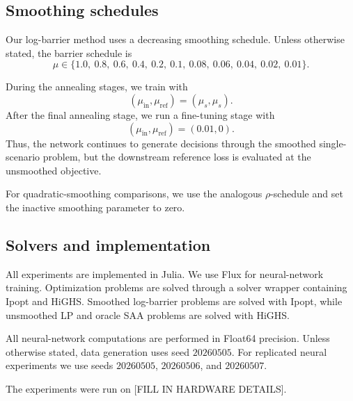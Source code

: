 \subsection{Smoothing schedules}

Our log-barrier method uses a decreasing smoothing schedule. Unless otherwise stated, the barrier schedule is
\[
\mu \in
\{1.0,\ 0.8,\ 0.6,\ 0.4,\ 0.2,\ 0.1,\ 0.08,\ 0.06,\ 0.04,\ 0.02,\ 0.01\}.
\]

During the annealing stages, we train with
\[
(\mu_{\mathrm{in}},\mu_{\mathrm{ref}})=(\mu_s,\mu_s).
\]
After the final annealing stage, we run a fine-tuning stage with
\[
(\mu_{\mathrm{in}},\mu_{\mathrm{ref}})=(0.01,0).
\]
Thus, the network continues to generate decisions through the smoothed single-scenario problem, but the downstream reference loss is evaluated at the unsmoothed objective.

For quadratic-smoothing comparisons, we use the analogous $\rho$-schedule and set the inactive smoothing parameter to zero.

\subsection{Solvers and implementation}

All experiments are implemented in Julia. We use Flux for neural-network training. Optimization problems are solved through a solver wrapper containing Ipopt and HiGHS. Smoothed log-barrier problems are solved with Ipopt, while unsmoothed LP and oracle SAA problems are solved with HiGHS.

All neural-network computations are performed in Float64 precision. Unless otherwise stated, data generation uses seed $20260505$. For replicated neural experiments we use seeds $20260505$, $20260506$, and $20260507$.

The experiments were run on [FILL IN HARDWARE DETAILS].

